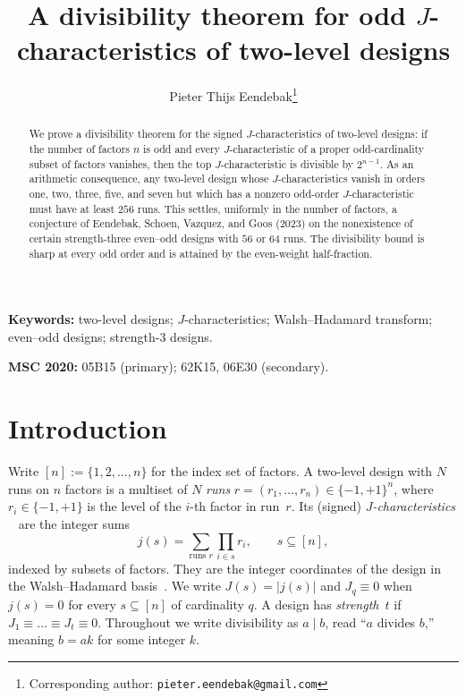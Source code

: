 \documentclass[11pt]{article}
\title{A divisibility theorem for odd $J$-characteristics of two-level designs}
\author{Pieter Thijs Eendebak\thanks{Corresponding author: \texttt{pieter.eendebak@gmail.com}}}
\date{}
\theoremstyle{definition}
\newcommand{\Fpm}{\{-1,+1\}}
\newcommand{\jc}{j}
\newcommand{\Jc}{J}
\begin{document}
\maketitle

\begin{abstract}
We prove a divisibility theorem for the signed $J$-characteristics of two-level
designs: if the number of factors $n$ is odd and every $J$-characteristic of a
proper odd-cardinality subset of factors vanishes, then the top
$J$-characteristic is divisible by $2^{n-1}$. As an arithmetic consequence, any two-level design whose
$J$-characteristics vanish in orders one, two, three, five, and seven but
which has a nonzero odd-order $J$-characteristic must have at least $256$ runs. This
settles, uniformly in the number of factors, a conjecture of Eendebak, Schoen,
Vazquez, and Goos (2023) on the nonexistence of certain strength-three
even--odd designs with $56$ or $64$ runs. The divisibility bound is sharp at
every odd order and is attained by the even-weight half-fraction.
\end{abstract}

\medskip
\noindent\textbf{Keywords:} two-level designs; 
$J$-characteristics; Walsh--Hadamard transform;
 even--odd designs;
strength-$3$ designs.

\smallskip
\noindent\textbf{MSC 2020:} 05B15 (primary); 62K15, 06E30 (secondary).

\section{Introduction}

Write $[n]:=\{1,2,\dots,n\}$ for the index set of factors. A two-level design
with $N$ runs on $n$ factors is a multiset of $N$ \emph{runs}
$r=(r_1,\dots,r_n)\in\Fpm^n$, where $r_i\in\{-1,+1\}$ is the level of the
$i$-th factor in run~$r$. Its (signed) \emph{$J$-characteristics}%
~\cite{DengTang1999,Tang2001} are the integer sums
\begin{equation}\label{eq:jchar-intro}
  \jc(s)=\sum_{\text{runs }r}\prod_{i\in s} r_i, \qquad s\subseteq[n],
\end{equation}
indexed by subsets of factors. They are the integer coordinates of the design
in the Walsh--Hadamard basis~\cite{ODonnell2014}. We write $\Jc(s)=|\jc(s)|$
and $J_q\equiv 0$ when $\jc(s)=0$ for every $s\subseteq[n]$ of cardinality $q$.
A design has \emph{strength~$t$} if $J_1\equiv\dots\equiv J_t\equiv 0$.
Throughout we write divisibility as $a\mid b$, read ``$a$ divides $b$,''
meaning $b=ak$ for some integer $k$.
\end{document}
